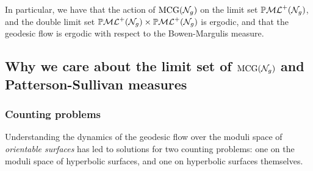 In particular, we have that the action of $\mathrm{MCG}(\mathcal{N}_g)$ on the limit set $\mathbb{P}\mathcal{ML}^+(\mathcal{N}_g)$, and the double limit set $\mathbb{P}\mathcal{ML}^+(\mathcal{N}_g) \times \mathbb{P}\mathcal{ML}^+(\mathcal{N}_g)$ is ergodic, and that the geodesic flow is ergodic with respect to the Bowen-Margulis measure.




\subsection*{Why we care about the limit set of $\mathrm{MCG}(\mathcal{N}_g)$ and Patterson-Sullivan measures}

\subsubsection*{Counting problems}

Understanding the dynamics of the geodesic flow over the moduli space of \emph{orientable surfaces} has led to solutions for two counting problems: one on the moduli space of hyperbolic surfaces, and one on hyperbolic surfaces themselves.

